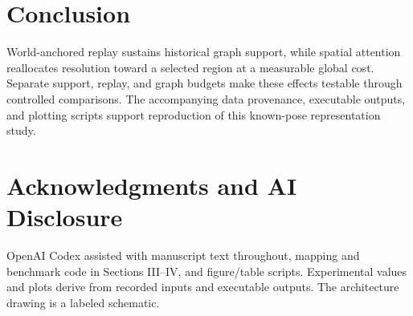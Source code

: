 \documentclass[letterpaper,10pt,conference]{template/ieeeconf}
\begin{document}
\section{Conclusion}
World-anchored replay sustains historical graph support, while spatial attention reallocates resolution toward a selected region at a measurable global cost. Separate support, replay, and graph budgets make these effects testable through controlled comparisons. The accompanying data provenance, executable outputs, and plotting scripts support reproduction of this known-pose representation study.

\section*{Acknowledgments and AI Disclosure}
OpenAI Codex assisted with manuscript text throughout, mapping and benchmark code in Sections III--IV, and figure/table scripts. Experimental values and plots derive from recorded inputs and executable outputs. The architecture drawing is a labeled schematic.



\end{document}
